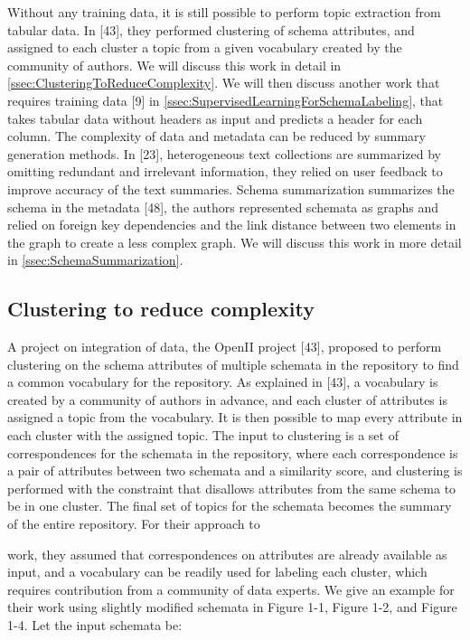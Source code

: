 Without any training data, it is still possible to perform topic extraction from tabular data. In [43], they performed clustering of schema attributes, and assigned to each cluster a topic from a given vocabulary created by the community of authors. We will discuss this work in detail in \autoref{ssec:ClusteringToReduceComplexity}. We will then discuss another work that requires training data [9] in \autoref{ssec:SupervisedLearningForSchemaLabeling}, that takes tabular data without headers as input and predicts a header for each column.
The complexity of data and metadata can be reduced by summary generation methods. In [23], heterogeneous text collections are summarized by omitting redundant and irrelevant information, they relied on user feedback to improve accuracy of the text summaries. Schema summarization summarizes the schema in the metadata [48], the authors represented schemata as graphs and relied on foreign key dependencies and the link distance between two elements in the graph to create a less complex graph. We will discuss this work in more detail in \autoref{ssec:SchemaSummarization}.

\subsection{Clustering to reduce complexity}
\label{ssec:ClusteringToReduceComplexity}

A project on integration of data, the OpenII project [43], proposed to perform clustering on the schema attributes of multiple schemata in the repository to find a common vocabulary for the repository. As explained in [43], a vocabulary is created by a community of authors in advance, and each cluster of attributes is assigned a topic from the vocabulary. It is then possible to map every attribute in each cluster with the assigned topic. The input to clustering is a set of correspondences for the schemata in the repository, where each correspondence is a pair of attributes between two schemata and a similarity score, and clustering is performed with the constraint that disallows attributes from the same schema to be in one cluster. The final set of topics for the schemata becomes the summary of the entire repository. For their approach to

work, they assumed that correspondences on attributes are already available as input, and a vocabulary can be readily used for labeling each cluster, which requires contribution from a community of data experts.
We give an example for their work using slightly modified schemata in Figure 1-1, Figure 1-2, and Figure 1-4. Let the input schemata be:


